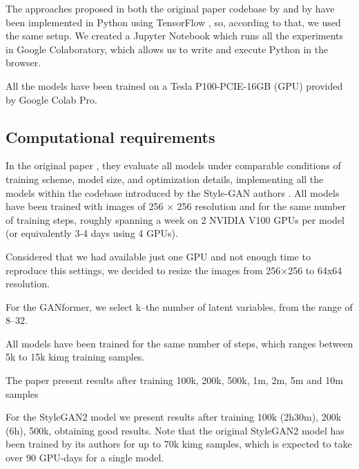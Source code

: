 \documentclass{article}
\begin{document}
	 The approaches proposed in both the original paper codebase by \citet{karras2020analyzing} and 
	 by \citet{hudson2021generative} have been implemented in Python using TensorFlow 
	 \cite{tensorflow2015-whitepaper}, so, according to that, we used the same setup.
	 We created a Jupyter Notebook which runs all the experiments in Google Colaboratory, which 
	 allows us to write and execute Python in the browser. %
	
	 All the models have been trained on a Tesla P100-PCIE-16GB (GPU) provided by Google 
	 Colab Pro.
	
	\subsection{Computational requirements}%
	In the original paper \cite{hudson2021generative}, they evaluate all models under comparable 
	conditions of training scheme, model size, and optimization details, implementing all the models 
	within the codebase introduced by the Style-GAN authors \cite{karras2020analyzing}. 
	All models have been trained with images of 256 × 256 resolution and for the 
	same number of training steps, roughly spanning a week on 2 NVIDIA V100 GPUs per model (or 
	equivalently 3-4 days using 4 GPUs). 
	
	Considered that we had available just one GPU and not enough time to reproduce this settings, we 
	decided to resize the images from 256×256 to 64x64 resolution.
	
	
	For the GANformer, we select k–the number of latent variables, from the range of 8–32. 
	
	All models have been trained for the same number of steps, which ranges between 5k to 15k kimg 
	training samples. 
	
	The paper present results after training 100k, 200k, 500k, 1m, 2m, 5m and 10m samples
	
	For the StyleGAN2 model we present results after training 100k (2h30m), 200k (6h), 500k, obtaining 
	good results.
	Note that the original StyleGAN2 model has been trained by its authors \cite{karras2020analyzing} 
	for up to 70k kimg samples, which is expected to take over 90 GPU-days for a single model. 
	
\end{document}
